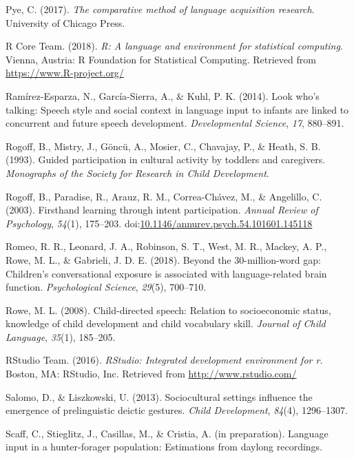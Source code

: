 \documentclass[floatsintext,man]{apa6}
\theoremstyle{definition}
\theoremstyle{definition}
\theoremstyle{definition}
\theoremstyle{remark}
\begin{document}
\hypertarget{ref-pye2017comparative}{}
Pye, C. (2017). \emph{The comparative method of language acquisition
research}. University of Chicago Press.

\hypertarget{ref-R-base}{}
R Core Team. (2018). \emph{R: A language and environment for statistical
computing}. Vienna, Austria: R Foundation for Statistical Computing.
Retrieved from \url{https://www.R-project.org/}

\hypertarget{ref-ramirezesparza2014look}{}
Ramírez-Esparza, N., García-Sierra, A., \& Kuhl, P. K. (2014). Look
who's talking: Speech style and social context in language input to
infants are linked to concurrent and future speech development.
\emph{Developmental Science}, \emph{17}, 880--891.

\hypertarget{ref-rogoff1993guided}{}
Rogoff, B., Mistry, J., Göncü, A., Mosier, C., Chavajay, P., \& Heath,
S. B. (1993). Guided participation in cultural activity by toddlers and
caregivers. \emph{Monographs of the Society for Research in Child
Development}.

\hypertarget{ref-rogoff2003firsthand}{}
Rogoff, B., Paradise, R., Arauz, R. M., Correa-Chávez, M., \& Angelillo,
C. (2003). Firsthand learning through intent participation. \emph{Annual
Review of Psychology}, \emph{54}(1), 175--203.
doi:\href{https://doi.org/10.1146/annurev.psych.54.101601.145118}{10.1146/annurev.psych.54.101601.145118}

\hypertarget{ref-romeo2018beyond}{}
Romeo, R. R., Leonard, J. A., Robinson, S. T., West, M. R., Mackey, A.
P., Rowe, M. L., \& Gabrieli, J. D. E. (2018). Beyond the
30-million-word gap: Children's conversational exposure is associated
with language-related brain function. \emph{Psychological Science},
\emph{29}(5), 700--710.

\hypertarget{ref-rowe2008child}{}
Rowe, M. L. (2008). Child-directed speech: Relation to socioeconomic
status, knowledge of child development and child vocabulary skill.
\emph{Journal of Child Language}, \emph{35}(1), 185--205.

\hypertarget{ref-R-studio}{}
RStudio Team. (2016). \emph{RStudio: Integrated development environment
for r}. Boston, MA: RStudio, Inc. Retrieved from
\url{http://www.rstudio.com/}

\hypertarget{ref-salomo2013sociocultural}{}
Salomo, D., \& Liszkowski, U. (2013). Sociocultural settings influence
the emergence of prelinguistic deictic gestures. \emph{Child
Development}, \emph{84}(4), 1296--1307.

\hypertarget{ref-scaffIPlanguage}{}
Scaff, C., Stieglitz, J., Casillas, M., \& Cristia, A. (in preparation).
Language input in a hunter-forager population: Estimations from daylong
recordings.
\end{document}
